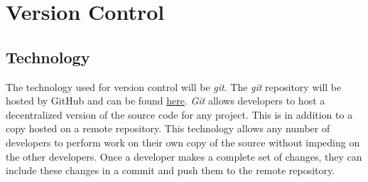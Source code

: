 \documentclass[11pt]{article}
\begin{document}
\section{Version Control}
\subsection{Technology}
The technology used for version control will be \textit{git}. The \textit{git} repository will be hosted by GitHub and can be found \href{https://github.com/ChristopherMcDonald/SoftwareTronCapstone}{here}. \textit{Git} allows developers to host a decentralized version of the source code for any project. This is in addition to a copy hosted on a remote repository. This technology allows any number of developers to perform work on their own copy of the source without impeding on the other developers. Once a developer makes a complete set of changes, they can include these changes in a commit and push them to the remote repository.
\end{document}
